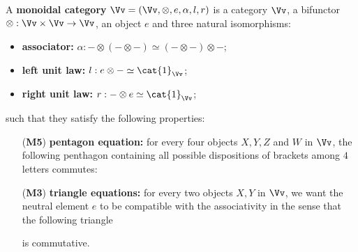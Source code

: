 \begin{df}
    A \textbf{monoidal category} $\Vv = (\Vv, \otimes, e, \alpha, l, r)$
    is a category $\Vv$, a bifunctor $\otimes:\Vv \times \Vv \to \Vv$,
    an object $e$ and three natural isomorphisms:
    \begin{itemize}
        \item \textbf{associator:} 
        $\alpha : - \otimes ( - \otimes - ) \simeq (- \otimes -) \otimes -$;
        \item  \textbf{left unit law:} $l: e \otimes - \simeq \cat{1}_{\Vv} $;
        \item  \textbf{right unit law:} $r: - \otimes e \simeq \cat{1}_{\Vv} $;
    \end{itemize}
    such that they satisfy the following properties:
    \begin{itemize}
        \item[(\textbf{M5})]\label{M5} \textbf{pentagon equation:} for every four objects $X,Y,Z$ and $W$ 
        in $\Vv$, the following penthagon containing all possible dispositions
        of brackets among $4$ letters commutes:
        \begin{center}
        \end{center}
        \item[(\textbf{M3})]\label{M3} \textbf{triangle equations:} 
        for every two objects $X, Y$ in $\Vv$, we want the neutral element $e$
        to be compatible with the associativity in the sense that the following triangle
        \begin{center}
        \end{center}
        is commutative.
    \end{itemize}
\end{df}

